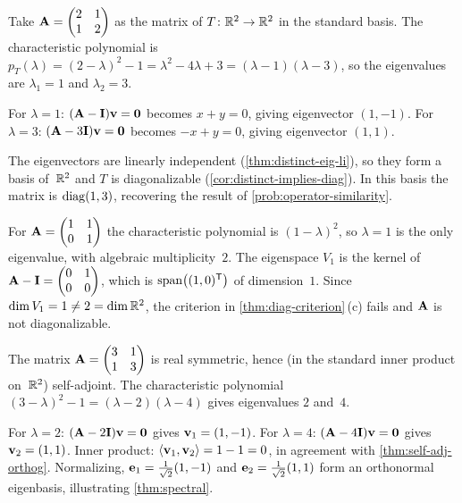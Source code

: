 \begin{example}
\label{ex:diag-distinct}
Take $\mathbf{A} = \begin{pmatrix} 2 & 1 \\ 1 & 2 \end{pmatrix}$ as the
matrix of $T \colon \mathbb{R}^2 \to \mathbb{R}^2$ in the standard basis. The
characteristic polynomial is
$p_T(\lambda) = (2 - \lambda)^2 - 1 = \lambda^2 - 4\lambda + 3 = (\lambda - 1)(\lambda - 3)$,
so the eigenvalues are $\lambda_1 = 1$ and $\lambda_2 = 3$.

For $\lambda = 1$: $(\mathbf{A} - \mathbf{I})\mathbf{v} = \mathbf{0}$ becomes
$x + y = 0$, giving eigenvector $(1, -1)$. For $\lambda = 3$:
$(\mathbf{A} - 3\mathbf{I})\mathbf{v} = \mathbf{0}$ becomes $-x + y = 0$,
giving eigenvector $(1, 1)$.

The eigenvectors are linearly independent (\cref{thm:distinct-eig-li}),
so they form a basis of~$\mathbb{R}^2$ and $T$ is diagonalizable
(\cref{cor:distinct-implies-diag}). In this basis the matrix is
$\operatorname{diag}(1, 3)$, recovering the result of \cref{prob:operator-similarity}.
\end{example}

\begin{example}
\label{ex:not-diag}
For $\mathbf{A} = \begin{pmatrix} 1 & 1 \\ 0 & 1 \end{pmatrix}$ the
characteristic polynomial is $(1 - \lambda)^2$, so $\lambda = 1$ is the
only eigenvalue, with algebraic multiplicity~$2$. The eigenspace
$V_1$ is the kernel of
$\mathbf{A} - \mathbf{I} = \begin{pmatrix} 0 & 1 \\ 0 & 0 \end{pmatrix}$,
which is $\operatorname{span}\bigl((1, 0)^{\mathsf{T}}\bigr)$ of dimension~$1$. Since
$\dim V_1 = 1 \neq 2 = \dim \mathbb{R}^2$, the criterion in
\cref{thm:diag-criterion}\,(c) fails and $\mathbf{A}$ is not
diagonalizable.
\end{example}

\begin{example}
\label{ex:self-adj}
The matrix $\mathbf{A} = \begin{pmatrix} 3 & 1 \\ 1 & 3 \end{pmatrix}$ is
real symmetric, hence (in the standard inner product on~$\mathbb{R}^2$)
self-adjoint. The characteristic polynomial
$(3 - \lambda)^2 - 1 = (\lambda - 2)(\lambda - 4)$ gives eigenvalues
$2$ and~$4$.

For $\lambda = 2$: $(\mathbf{A} - 2\mathbf{I})\mathbf{v} = \mathbf{0}$ gives
$\mathbf{v}_1 = (1, -1)$. For $\lambda = 4$: $(\mathbf{A} - 4\mathbf{I})\mathbf{v} = \mathbf{0}$
gives $\mathbf{v}_2 = (1, 1)$. Inner product: $\langle \mathbf{v}_1, \mathbf{v}_2 \rangle = 1 - 1 = 0$,
in agreement with \cref{thm:self-adj-orthog}. Normalizing,
$\mathbf{e}_1 = \tfrac{1}{\sqrt{2}}(1, -1)$ and
$\mathbf{e}_2 = \tfrac{1}{\sqrt{2}}(1, 1)$ form an orthonormal eigenbasis,
illustrating \cref{thm:spectral}.
\end{example}

